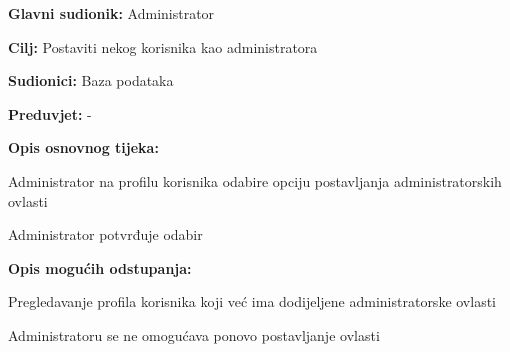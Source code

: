 				
					\noindent {}
					\begin{packed_item}
						
						\item \textbf{Glavni sudionik: }Administrator
						\item  \textbf{Cilj:} Postaviti nekog korisnika kao administratora 
						\item  \textbf{Sudionici:} Baza podataka
						\item  \textbf{Preduvjet:} -
						\item  \textbf{Opis osnovnog tijeka:}
						
						\item[] \begin{packed_enum}
							
							\item Administrator na profilu korisnika odabire opciju postavljanja administratorskih ovlasti
							\item Administrator potvrđuje odabir
							
						\end{packed_enum}
						
						\item  \textbf{Opis mogućih odstupanja:}
						
						\item[] \begin{packed_item}
							
							\item[1.a] Pregledavanje profila korisnika koji već ima dodijeljene administratorske ovlasti
							\item[] \begin{packed_enum}
								
								\item Administratoru se ne omogućava ponovo postavljanje ovlasti
								
							\end{packed_enum}
							
						\end{packed_item}
					\end{packed_item}
				
